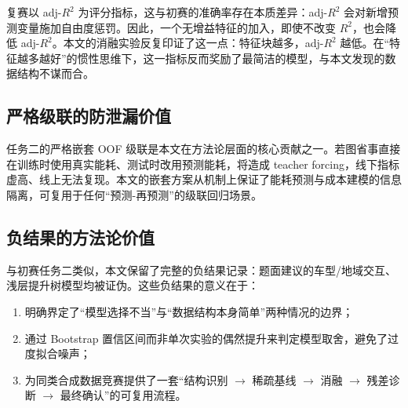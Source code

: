 复赛以 adj-$R^2$ 为评分指标，这与初赛的准确率存在本质差异：adj-$R^2$ 会对新增预测变量施加自由度惩罚。因此，一个无增益特征的加入，即使不改变 $R^2$，也会降低 adj-$R^2$。本文的消融实验反复印证了这一点：特征块越多，adj-$R^2$ 越低。在``特征越多越好''的惯性思维下，这一指标反而奖励了最简洁的模型，与本文发现的数据结构不谋而合。

\subsection{严格级联的防泄漏价值}

任务二的严格嵌套 OOF 级联是本文在方法论层面的核心贡献之一。若图省事直接在训练时使用真实能耗、测试时改用预测能耗，将造成 teacher forcing，线下指标虚高、线上无法复现。本文的嵌套方案从机制上保证了能耗预测与成本建模的信息隔离，可复用于任何``预测-再预测''的级联回归场景。

\subsection{负结果的方法论价值}

与初赛任务二类似，本文保留了完整的负结果记录：题面建议的车型/地域交互、浅层提升树模型均被证伪。这些负结果的意义在于：

\begin{enumerate}[itemsep=0pt]
\item 明确界定了``模型选择不当''与``数据结构本身简单''两种情况的边界；
\item 通过 Bootstrap 置信区间而非单次实验的偶然提升来判定模型取舍，避免了过度拟合噪声；
\item 为同类合成数据竞赛提供了一套``结构识别 $\to$ 稀疏基线 $\to$ 消融 $\to$ 残差诊断 $\to$ 最终确认''的可复用流程。
\end{enumerate}
